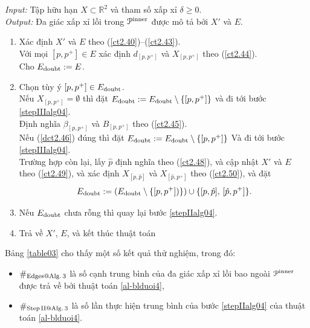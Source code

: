 \documentclass[12pt,a4paper,openany,oneside]{report}
\def\R{\mathbb{R}}
\begin{document}
\begin{algorithm}\label{alg04}  \rm 
	\caption{}  \label{al-blduoi4}
	\emph{Input:} Tập hữu hạn $X \subset \R^2$ và tham số xấp xỉ $\delta \geq 0$. \\
	\emph{Output:} Đa giác xấp xỉ lồi trong ${\cal P}^{\rm inner}$ được mô tả bởi $X'$ và $E$.
	\begin{enumerate}
		\item\label{stepIalg04} 
		Xác định $X'$ và $E$ theo (\ref{ct2.40})--(\ref{ct2.43}).\\
		Với mọi $[p, p^+] \in E$ xác định $d_{[p, p^+]}$ và $X_{[p, p^+]}$ theo (\ref{ct2.44}).\\
		Cho $E_{\rm doubt} := E$.
		
		\item\label{stepIIalg04} 
		 Chọn tùy ý $[p, p^+] \in E_{\rm doubt}$. \\
		Nếu $X_{[p, p^+]} = \emptyset$ thì đặt
		$E_{\rm doubt} := E_{\rm doubt} \setminus \{[p, p^+]\}$
		và đi tới bước \ref{stepIIIalg04}.\\
		Định nghĩa $\beta_{[p, p^+]}$ và $B_{[p, p^+]}$ theo (\ref{ct2.45}). \\
		Nếu (\ref{dct2.46}) đúng thì đặt
		$E_{\rm doubt} := E_{\rm doubt} \setminus \{[p, p^+]\}$
		Và đi tới bước \ref{stepIIIalg04}.\\
		Trường hợp còn lại, lấy $\hat p$ định nghĩa theo (\ref{ct2.48}),
		và cập nhật $X'$ và $E$ theo (\ref{ct2.49}), và xác định $X_{[p, \hat p]}$ và $X_{[\hat p, p^+]}$ theo (\ref{ct2.50}),	và đặt
		\begin{equation*}%
			E_{\rm doubt} := (E_{\rm doubt} \setminus \{[p, p^+])\}) \cup \{[p, \hat p], \, [\hat p, p^+]\}.
		\end{equation*}
		
		\item\label{stepIIIalg04} 
		Nếu $E_{\rm doubt}$ chưa rỗng thì quay lại bước \ref{stepIIalg04}.
		
		\item
		Trả về $X'$, $E$, và kết thúc thuật toán
	\end{enumerate}
\end{algorithm}


\medskip
Bảng \ref{table03} cho thấy một số kết quả thử nghiệm, trong đó:
\begin{itemize}
	\item $\#_{\rm Edges@ Alg.\, 3}$  là số cạnh trung bình của đa giác xấp xỉ lồi bao ngoài ${\cal P}^{\rm inner}$ được trả về bởi thuật toán \ref{al-blduoi4},
	\item $\#_{\rm Step\, II @ Alg.\, 3}$ là số lần thực hiện trung bình của bước \ref{stepIIalg04} của thuật toán \ref{al-blduoi4}.
\end{itemize}
\end{document}
